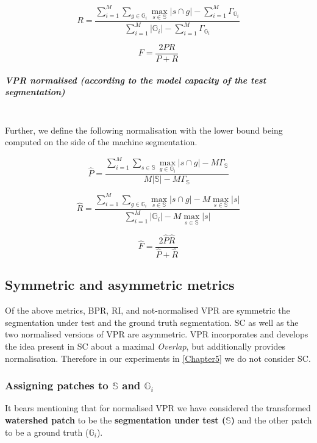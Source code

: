 \[
R=\frac{\sum\limits _{i=1}^{M}\sum\limits _{g\in\mathbb{G}_{i}}\max\limits _{s\in\mathbb{S}}\left|s\cap g\right|-\boxed{\sum\limits _{i=1}^{M}\Gamma_{\mathbb{G}_{i}}}}{\sum\limits _{i=1}^{M}\left|\mathbb{G}_{i}\right|-\boxed{\sum\limits _{i=1}^{M}\Gamma_{\mathbb{G}_{i}}}}
\]

\[
F=\frac{2PR}{P+R}
\]

\subparagraph{VPR normalised (according to the model capacity of the test segmentation)}\mbox{}\\ %
Further, we define the following normalisation with the lower bound being computed on the side of the machine segmentation.

\[
\hat{P}=\frac{\sum\limits _{i=1}^{M}\sum\limits _{s\in\mathbb{S}}\max\limits _{g\in\mathbb{G}_{i}}\left|s\cap g\right|-\boxed{M\Gamma_{\mathbb{S}}}}{M\left|\mathbb{S}\right|-\boxed{M\Gamma_{\mathbb{S}}}}
\]

\[
\hat{{R}}=\frac{\sum\limits _{i=1}^{M}\sum\limits _{g\in\mathbb{G}_{i}}\max\limits _{s\in\mathbb{S}}\left|s\cap g\right|-\boxed{M\max_{s\in\mathbb{S}}\left|s\right|}}{\sum\limits _{i=1}^{M}\left|\mathbb{G}_{i}\right|-\boxed{M\max_{s\in\mathbb{S}}\left|s\right|}}
\]

\[
\hat{{F}}=\frac{2\hat{P}\hat{R}}{\hat{P}+\hat{R}}
\]

\subsection{Symmetric and asymmetric metrics}
Of the above metrics, BPR, RI, and not-normalised VPR are symmetric \wrt the segmentation under test and the ground truth segmentation. SC as well as the two normalised versions of VPR are asymmetric. VPR incorporates and develops the idea present in SC about a maximal \textit{Overlap}, but additionally provides normalisation. Therefore in our experiments in \cref{Chapter5} we do not consider SC.


\subsubsection{Assigning patches to \texorpdfstring{$\mathbb{S}$}{S} and \texorpdfstring{$\mathbb{G}_i$}{G}}
\label{sec:ch4-asymmetry-VPR-assigning-patches-S-G}
It bears mentioning %
that for normalised VPR we have considered the transformed \textbf{watershed patch} to be the \textbf{segmentation under test ($\mathbb{S}$)} and the other patch to be a ground truth ($\mathbb{G}_i$). 

